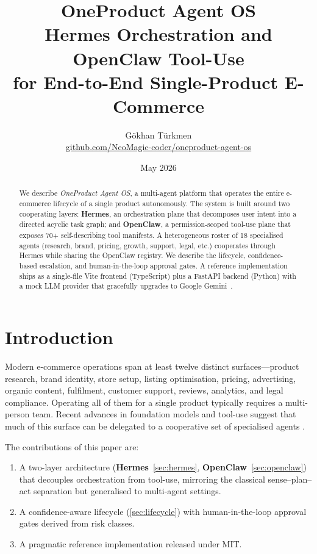 \documentclass[11pt,a4paper]{article}
\title{\textbf{OneProduct Agent OS}\\
\large Hermes Orchestration and OpenClaw Tool-Use\\
for End-to-End Single-Product E-Commerce}
\author{Gökhan Türkmen\\
\small \href{https://github.com/NeoMagic-coder/oneproduct-agent-os}{github.com/NeoMagic-coder/oneproduct-agent-os}}
\date{May 2026}
\begin{document}
\maketitle

\begin{abstract}
We describe \emph{OneProduct Agent OS}, a multi-agent platform that operates the
entire e-commerce lifecycle of a single product autonomously. The system is built
around two cooperating layers: \textbf{Hermes}, an orchestration plane that
decomposes user intent into a directed acyclic task graph; and \textbf{OpenClaw},
a permission-scoped tool-use plane that exposes 70+ self-describing tool
manifests. A heterogeneous roster of 18 specialised agents (research, brand,
pricing, growth, support, legal, etc.) cooperates through Hermes while sharing
the OpenClaw registry. We describe the lifecycle, confidence-based escalation,
and human-in-the-loop approval gates. A reference implementation ships as a
single-file Vite frontend (TypeScript) plus a FastAPI backend (Python) with a
mock LLM provider that gracefully upgrades to Google Gemini~\cite{gemini2024}.
\end{abstract}

\section{Introduction}

Modern e-commerce operations span at least twelve distinct surfaces---product
research, brand identity, store setup, listing optimisation, pricing,
advertising, organic content, fulfilment, customer support, reviews, analytics,
and legal compliance. Operating all of them for a single product typically
requires a multi-person team. Recent advances in foundation models and tool-use
\cite{schick2023toolformer, yao2023react} suggest that much of this surface can
be delegated to a cooperative set of specialised agents
\cite{wu2023autogen, shen2023hugginggpt}.

The contributions of this paper are:
\begin{enumerate}
  \item A two-layer architecture (\textbf{Hermes}~\textsection\ref{sec:hermes},
    \textbf{OpenClaw}~\textsection\ref{sec:openclaw}) that decouples
    orchestration from tool-use, mirroring the classical
    sense--plan--act separation but generalised to multi-agent settings.
  \item A confidence-aware lifecycle (\textsection\ref{sec:lifecycle}) with
    human-in-the-loop approval gates derived from risk classes.
  \item A pragmatic reference implementation released under MIT.
\end{enumerate}
\end{document}
